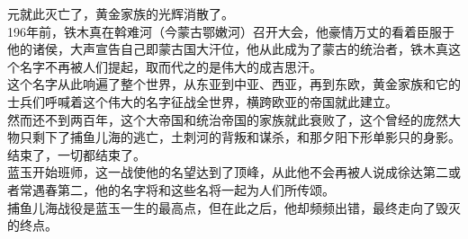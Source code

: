 \begin{multicols}{\theparacolNo}
元就此灭亡了，黄金家族的光辉消散了。\\

196年前，铁木真在斡难河（今蒙古鄂嫩河）召开大会，他豪情万丈的看着臣服于他的诸侯，大声宣告自己即蒙古国大汗位，他从此成为了蒙古的统治者，铁木真这个名字不再被人们提起，取而代之的是伟大的成吉思汗。\\

这个名字从此响遍了整个世界，从东亚到中亚、西亚，再到东欧，黄金家族和它的士兵们呼喊着这个伟大的名字征战全世界，横跨欧亚的帝国就此建立。\\

然而还不到两百年，这个大帝国和统治帝国的家族就此衰败了，这个曾经的庞然大物只剩下了捕鱼儿海的逃亡，土刺河的背叛和谋杀，和那夕阳下形单影只的身影。\\

结束了，一切都结束了。\\

蓝玉开始班师，这一战使他的名望达到了顶峰，从此他不会再被人说成徐达第二或者常遇春第二，他的名字将和这些名将一起为人们所传颂。\\

捕鱼儿海战役是蓝玉一生的最高点，但在此之后，他却频频出错，最终走向了毁灭的终点。\\
\ifnum{}
	\end{multicols}
\fi
\newpage
